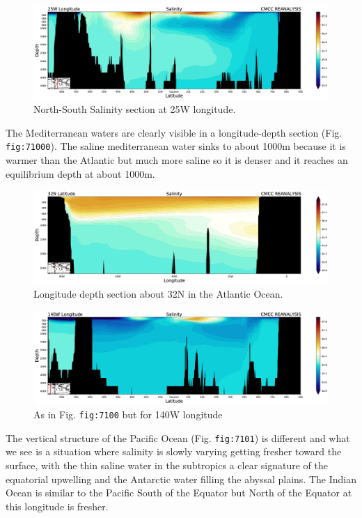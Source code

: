 \begin{figure}
\centering
\includegraphics[width = .7 \textwidth]{figs/GD/SectSal25W5000.png}
\caption{North-South Salinity section at 25W longitude.}
\end{figure}

The Mediterranean waters are clearly visible in a longitude-depth
section (Fig. \texttt{fig:71000}). The saline mediterranean water sinks
to about 1000m because it is warmer than the Atlantic but much more
saline so it is denser and it reaches an equilibrium depth at about
1000m.

\begin{figure}
\centering
\includegraphics[width = .7 \textwidth]{figs/GD/SectSalinity32N3000.png}
\caption{Longitude depth section about 32N in the Atlantic Ocean.}
\end{figure}

\begin{figure}
\centering
\includegraphics[width = .7 \textwidth]{figs/GD/SectSal140W5000.png}
\caption{As in Fig. \texttt{fig:7100} but for 140W longitude}
\end{figure}

The vertical structure of the Pacific Ocean (Fig. \texttt{fig:7101}) is
different and what we see is a situation where salinity is slowly
varying getting fresher toward the surface, with the thin saline water
in the subtropics a clear signature of the equatorial upwelling and the
Antarctic water filling the abyssal plains. The Indian Ocean is similar
to the Pacific South of the Equator but North of the Equator at this
longitude is fresher.

